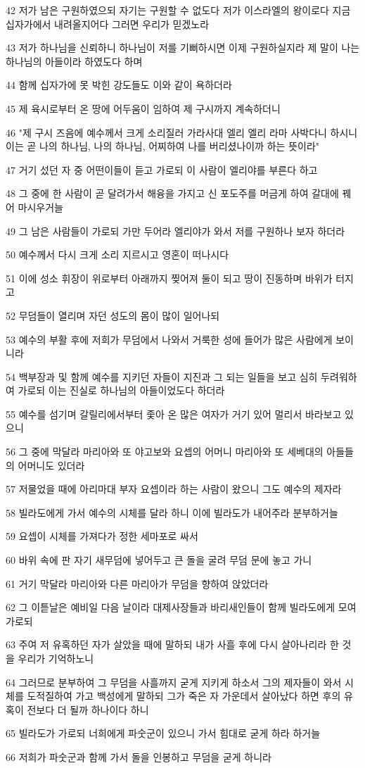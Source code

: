 \par 42 저가 남은 구원하였으되 자기는 구원할 수 없도다 저가 이스라엘의 왕이로다 지금 십자가에서 내려올지어다 그러면 우리가 믿겠노라
\par 43 저가 하나님을 신뢰하니 하나님이 저를 기뻐하시면 이제 구원하실지라 제 말이 나는 하나님의 아들이라 하였도다 하며
\par 44 함께 십자가에 못 박힌 강도들도 이와 같이 욕하더라
\par 45 제 육시로부터 온 땅에 어두움이 임하여 제 구시까지 계속하더니
\par 46 "제 구시 즈음에 예수께서 크게 소리질러 가라사대 엘리 엘리 라마 사박다니 하시니 이는 곧 나의 하나님, 나의 하나님, 어찌하여 나를 버리셨나이까 하는 뜻이라"
\par 47 거기 섰던 자 중 어떤이들이 듣고 가로되 이 사람이 엘리야를 부른다 하고
\par 48 그 중에 한 사람이 곧 달려가서 해융을 가지고 신 포도주를 머금게 하여 갈대에 꿰어 마시우거늘
\par 49 그 남은 사람들이 가로되 가만 두어라 엘리야가 와서 저를 구원하나 보자 하더라
\par 50 예수께서 다시 크게 소리 지르시고 영혼이 떠나시다
\par 51 이에 성소 휘장이 위로부터 아래까지 찢어져 둘이 되고 땅이 진동하며 바위가 터지고
\par 52 무덤들이 열리며 자던 성도의 몸이 많이 일어나되
\par 53 예수의 부활 후에 저희가 무덤에서 나와서 거룩한 성에 들어가 많은 사람에게 보이니라
\par 54 백부장과 및 함께 예수를 지키던 자들이 지진과 그 되는 일들을 보고 심히 두려워하여 가로되 이는 진실로 하나님의 아들이었도다 하더라
\par 55 예수를 섬기며 갈릴리에서부터 좇아 온 많은 여자가 거기 있어 멀리서 바라보고 있으니
\par 56 그 중에 막달라 마리아와 또 야고보와 요셉의 어머니 마리아와 또 세베대의 아들들의 어머니도 있더라
\par 57 저물었을 때에 아리마대 부자 요셉이라 하는 사람이 왔으니 그도 예수의 제자라
\par 58 빌라도에게 가서 예수의 시체를 달라 하니 이에 빌라도가 내어주라 분부하거늘
\par 59 요셉이 시체를 가져다가 정한 세마포로 싸서
\par 60 바위 속에 판 자기 새무덤에 넣어두고 큰 돌을 굴려 무덤 문에 놓고 가니
\par 61 거기 막달라 마리아와 다른 마리아가 무덤을 향하여 앉았더라
\par 62 그 이튿날은 예비일 다음 날이라 대제사장들과 바리새인들이 함께 빌라도에게 모여 가로되
\par 63 주여 저 유혹하던 자가 살았을 때에 말하되 내가 사흘 후에 다시 살아나리라 한 것을 우리가 기억하노니
\par 64 그러므로 분부하여 그 무덤을 사흘까지 굳게 지키게 하소서 그의 제자들이 와서 시체를 도적질하여 가고 백성에게 말하되 그가 죽은 자 가운데서 살아났다 하면 후의 유혹이 전보다 더 될까 하나이다 하니
\par 65 빌라도가 가로되 너희에게 파숫군이 있으니 가서 힘대로 굳게 하라 하거늘
\par 66 저희가 파숫군과 함께 가서 돌을 인봉하고 무덤을 굳게 하니라

